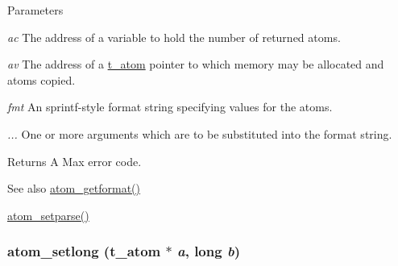 \begin{DoxyParams}{Parameters}
\item[{\em ac}]The address of a variable to hold the number of returned atoms. \item[{\em av}]The address of a \hyperlink{structt__atom}{t\_\-atom} pointer to which memory may be allocated and atoms copied. \item[{\em fmt}]An sprintf-\/style format string specifying values for the atoms. \item[{\em ...}]One or more arguments which are to be substituted into the format string.\end{DoxyParams}
\begin{DoxyReturn}{Returns}
A Max error code. 
\end{DoxyReturn}
\begin{DoxySeeAlso}{See also}
\hyperlink{group__atom_gadf4cd1c3cae12c062fb07ffca5dbf0c0}{atom\_\-getformat()} 

\hyperlink{group__atom_ga55938aedb41a8f3565680cf29169dc70}{atom\_\-setparse()} 
\end{DoxySeeAlso}
\hypertarget{group__atom_ga98af493b18dfac0f8d441e16e520d5f6}{
\subsubsection[{atom\_\-setlong}]{ atom\_\-setlong ({\bf t\_\-atom} $\ast$ {\em a}, \/  long {\em b})}}
\label{group__atom_ga98af493b18dfac0f8d441e16e520d5f6}


